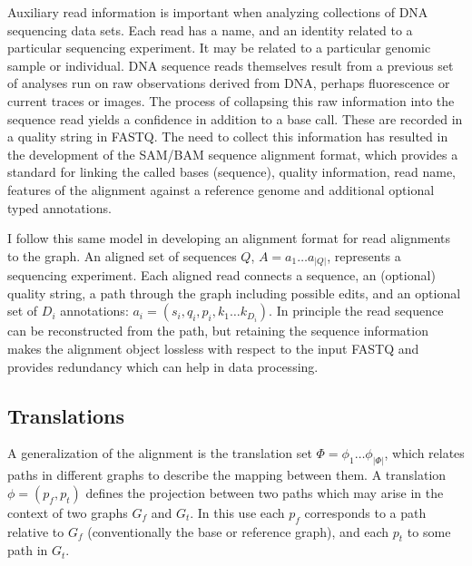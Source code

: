 Auxiliary read information is important when analyzing collections of DNA sequencing data sets.
Each read has a name, and an identity related to a particular sequencing experiment.
It may be related to a particular genomic sample or individual.
DNA sequence reads themselves result from a previous set of analyses run on raw observations derived from DNA, perhaps fluorescence or current traces or images.
The process of collapsing this raw information into the sequence read yields a confidence in addition to a base call.
These are recorded in a quality string in FASTQ.
The need to collect this information has resulted in the development of the SAM/BAM sequence alignment format, which provides a standard for linking the called bases (sequence), quality information, read name, features of the alignment against a reference genome and additional optional typed annotations.

I follow this same model in developing an alignment format for read alignments to the graph.
An aligned set of sequences $Q$, $A = a_1 \ldots a_{|Q|}$, represents a sequencing experiment.
Each aligned read connects a sequence, an (optional) quality string, a path through the graph including possible edits, and an optional set of $D_i$ annotations: $a_i = (s_i, q_i, p_i, k_1\ldots k_{D_i})$.
In principle the read sequence can be reconstructed from the path, but retaining the sequence information makes the alignment object lossless with respect to the input FASTQ and provides redundancy which can help in data processing.

\subsection{Translations}
\label{sec:translation}

A generalization of the alignment is the translation set $\Phi = \phi_1 \ldots \phi_{|\Phi|}$, which relates paths in different graphs to describe the mapping between them.
A translation $\phi = (p_f, p_t)$ defines the projection between two paths which may arise in the context of two graphs $G_f$ and $G_t$.
In this use each $p_f$ corresponds to a path relative to $G_f$ (conventionally the base or reference graph), and each $p_t$ to some path in $G_t$.

